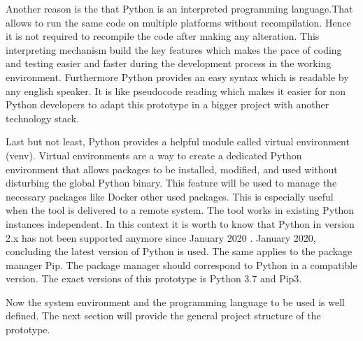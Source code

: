 Another reason is the that Python is an interpreted programming language.That allows to run the same code on multiple platforms without recompilation. Hence it is not required to recompile the code after making any alteration. This interpreting mechanism build the key features which makes the pace of coding and testing easier and faster during the development process in the working environment. 
Furthermore Python provides an easy syntax which is readable by any english speaker. It is like pseudocode reading which makes it easier for non Python developers to adapt this prototype in a bigger project with another technology stack. 

Last but not least, Python provides a helpful module called virtual environment (venv). Virtual environments are a way to create a dedicated Python environment that allows packages to be installed, modified, and used without disturbing the global Python binary. This feature will be used to manage the necessary packages like Docker other used packages. This is especially useful when the tool is delivered to a remote system. The tool works in existing Python instances independent. In this context it is worth to know that Python in version 2.x has not been supported anymore since January 2020 \cite{python_deprecated}. January 2020, concluding the latest version of Python is used. The same applies to the package manager Pip. The package manager should correspond to Python in a compatible version. 
The exact versions of this prototype is Python 3.7 and Pip3.

Now the system environment and the programming language to be used is well defined. The next section will provide the general project structure of the prototype.